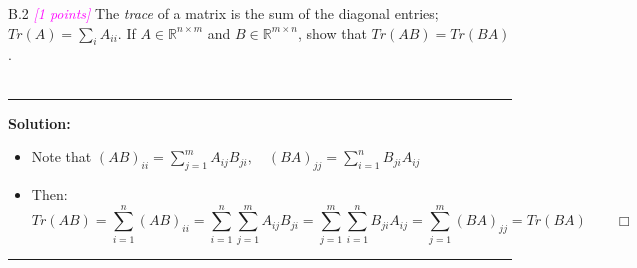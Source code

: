 \documentclass{article}
\newcommand{\1}{\mathbf{1}}
\newcommand{\points}[1]{\small\textcolor{magenta}{\emph{[#1 points]}} \normalsize}
\begin{document}
B.2 \points{1} The \textit{trace} of a matrix is the sum of the diagonal entries; $Tr(A) = \sum_i A_{ii}$. If $A\in\mathbb{R}^{n\times m}$ and $B\in\mathbb{R}^{m\times n}$, show that $Tr(AB) = Tr(BA)$.	\\
\\
    \noindent\rule{\textwidth}{1pt}
    {\bf Solution:}\\
    \begin{itemize}
        \item Note that $(AB)_{ii} = \sum_{j=1}^m A_{ij}B_{ji}, \quad (BA)_{jj} = \sum_{i=1}^n B_{ji}A_{ij}$
        \item Then: 
        $$
        Tr(AB) = \sum_{i=1}^n(AB)_{ii} = \sum_{i=1}^n\sum_{j=1}^m A_{ij}B_{ji} =
        \sum_{j=1}^m\sum_{i=1}^n B_{ji}A_{ij} = \sum_{j=1}^m(BA)_{jj} = Tr(BA) \qquad \Box
        $$
    \end{itemize}        


    \noindent\rule{\textwidth}{1pt}
\end{document}
